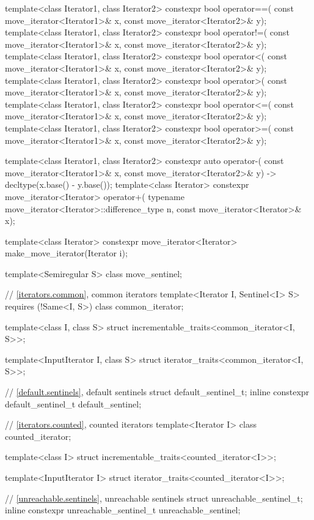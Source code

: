 \begin{codeblock}
{  template<class Iterator1, class Iterator2>
    constexpr bool operator==(
      const move_iterator<Iterator1>& x, const move_iterator<Iterator2>& y);
  template<class Iterator1, class Iterator2>
    constexpr bool operator!=(
      const move_iterator<Iterator1>& x, const move_iterator<Iterator2>& y);
  template<class Iterator1, class Iterator2>
    constexpr bool operator<(
      const move_iterator<Iterator1>& x, const move_iterator<Iterator2>& y);
  template<class Iterator1, class Iterator2>
    constexpr bool operator>(
      const move_iterator<Iterator1>& x, const move_iterator<Iterator2>& y);
  template<class Iterator1, class Iterator2>
    constexpr bool operator<=(
      const move_iterator<Iterator1>& x, const move_iterator<Iterator2>& y);
  template<class Iterator1, class Iterator2>
    constexpr bool operator>=(
      const move_iterator<Iterator1>& x, const move_iterator<Iterator2>& y);

  template<class Iterator1, class Iterator2>
    constexpr auto operator-(
    const move_iterator<Iterator1>& x,
    const move_iterator<Iterator2>& y) -> decltype(x.base() - y.base());
  template<class Iterator>
    constexpr move_iterator<Iterator> operator+(
      typename move_iterator<Iterator>::difference_type n, const move_iterator<Iterator>& x);

  template<class Iterator>
    constexpr move_iterator<Iterator> make_move_iterator(Iterator i);

  template<Semiregular S> class move_sentinel;

  // \ref{iterators.common}, common iterators
  template<Iterator I, Sentinel<I> S>
    requires (!Same<I, S>)
      class common_iterator;

  template<class I, class S>
    struct incrementable_traits<common_iterator<I, S>>;

  template<InputIterator I, class S>
    struct iterator_traits<common_iterator<I, S>>;

  // \ref{default.sentinels}, default sentinels
  struct default_sentinel_t;
  inline constexpr default_sentinel_t default_sentinel{};

  // \ref{iterators.counted}, counted iterators
  template<Iterator I> class counted_iterator;

  template<class I>
    struct incrementable_traits<counted_iterator<I>>;

  template<InputIterator I>
    struct iterator_traits<counted_iterator<I>>;

  // \ref{unreachable.sentinels}, unreachable sentinels
  struct unreachable_sentinel_t;
  inline constexpr unreachable_sentinel_t unreachable_sentinel{};

}
\end{codeblock}
